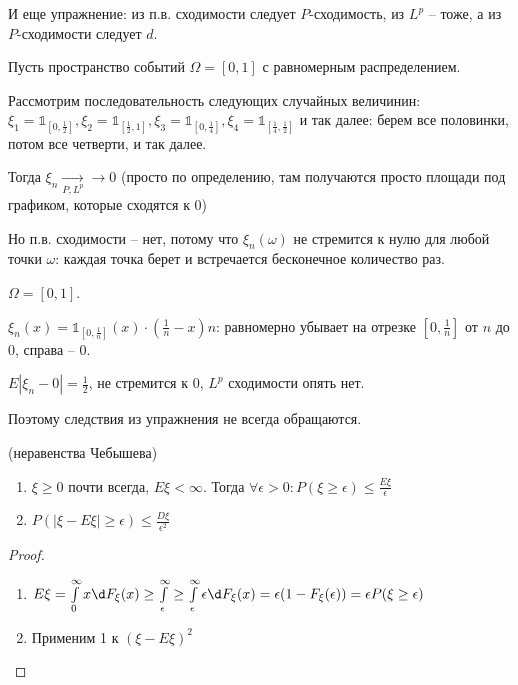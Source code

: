 И еще упражнение: из п.в. сходимости следует $P$-сходимость, из $L^p$ -- тоже, а из $P$-сходимости следует $d$.

\begin{exmp}
Пусть пространство событий $\Omega = [0, 1]$ с равномерным распределением.

Рассмотрим последовательность следующих случайных величинин: $\xi_1 = \mathbb{1}_{[0, \frac12]}, \xi_2 = \mathbb{1}_{[\frac12, 1]}, \xi_3 = \mathbb{1}_{[0, \frac14]}, \xi_4 = \mathbb{1}_{[\frac14, \frac12]}$ и так далее: 
берем все половинки, потом все четверти, и так далее.

Тогда $\xi_n \xrightarrow[P, L^p]{} \to 0$ (просто по определению, там получаются просто площади под графиком, которые сходятся к 0)

Но п.в. сходимости -- нет, потому что $\xi_n(\omega)$ не стремится к нулю для любой точки $\omega$: каждая точка берет и встречается бесконечное количество раз. 
\end{exmp}
\begin{exmp}
$\Omega = [0, 1]$.

$\xi_n(x) = \mathbb{1}_{[0, \frac1n]}(x) \cdot (\frac1n - x)n$: равномерно убывает на отрезке $[0, \frac1n]$ от $n$ до $0$, справа -- 0.

$E|\xi_n - 0| = \frac12$, не стремится к 0, $L^p$ сходимости опять нет.

Поэтому следствия из упражнения не всегда обращаются.
\end{exmp}

\begin{theorem} (неравенства Чебышева)

\begin{enumerate}

\item $\xi \geq 0$ почти всегда, $E\xi < \infty$. Тогда $\forall \epsilon > 0\colon P(\xi \geq \epsilon) \leq \frac{E\xi}{\epsilon}$

\item $P(|\xi - E\xi| \geq \epsilon) \leq \frac{D\xi}{\epsilon^2}$
\end{enumerate}
\begin{proof}
\begin{enumerate}                      
\item $E\xi = \int\limits_0^\infty x\d F_\xi(x) \geq \int\limits_\epsilon^\infty \geq \int\limits_\epsilon^\infty \epsilon \d F_\xi(x) = \epsilon (1 - F_\xi(\epsilon)) = \epsilon P(\xi \geq \epsilon)$

\item Применим 1 к $(\xi - E\xi)^2$ 
\end{enumerate}
\end{proof}
\end{theorem}


